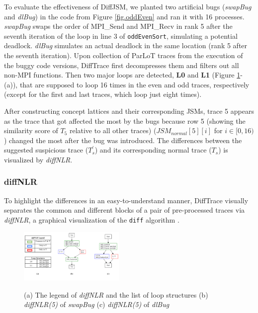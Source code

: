 To evaluate the effectiveness of DiffJSM, we planted two artificial bugs (\textit{swapBug}
and \textit{dlBug}) in the code from Figure \ref{fig.oddEven} and ran it with 16 processes.
%
\textit{swapBug} swaps the order of MPI\_Send and MPI\_Recv in rank 5
after the seventh iteration of the loop in line 3 of \texttt{oddEvenSort},
simulating a potential deadlock. \textit{dlBug} simulates an actual deadlock in the same location
(rank 5 after the seventh iteration).
%
Upon collection of ParLoT traces from the execution of the buggy code versions,
DiffTrace first decompresses them and filters out all non-MPI functions.
Then two major loops are detected, \textbf{L0} and \textbf{L1} (Figure \ref{fig.gdiffs}-(a)),
that are supposed to loop 16 times in the even and odd traces,
respectively (except for the first and last traces, which loop just eight times).

After constructing concept lattices and their corresponding JSMs, trace 5 appears as the trace that got
affected the most by the bugs because row 5 (showing the similarity score of $T_5$ relative to all other traces)
($JSM_{normal}[5][i]$ for $i \in [0,16)$)
  changed the most after the bug was introduced.
%
The differences between the suggested suspicious trace ($T^\prime_s$)
and its corresponding normal trace ($T_s$) is visualized by \textit{diffNLR}.


\subsubsection{diffNLR}
To highlight the differences in an easy-to-understand manner, DiffTrace visually separates the common and different blocks of a pair of pre-processed traces via \textit{diffNLR}, a graphical visualization of the \texttt{diff} algorithm \cite{diff-myers}.
%

\begin{figure}[]
\centering
\caption{(a) The legend of \textit{diffNLR} and the list of loop structures (b) \textit{diffNLR(5)} of \textit{swapBug} (c) \textit{diffNLR(5)} of \textit{dlBug}}
\includegraphics[width=0.45\textwidth]{figs/sampleGdiff.png}
\label{fig.gdiffs}
\end{figure}


